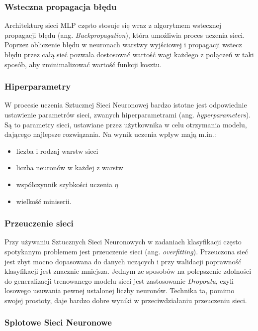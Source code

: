 \subsubsection{Wsteczna propagacja błędu}
Architekturę sieci MLP często stosuje się wraz z algorytmem wstecznej 
propagacji błędu (ang. \emph{Backpropagation}), która umożliwia proces uczenia sieci. Poprzez obliczenie błędu w neuronach warstwy wyjściowej i propagacji 
wstecz błędu przez całą sieć pozwala dostosować wartość wagi każdego z połączeń
w taki sposób, aby zminimalizować wartość funkcji kosztu.


\subsubsection{Hiperparametry}
W procesie uczenia Sztucznej Sieci Neuronowej bardzo istotne jest odpowiednie ustawienie parametrów sieci, zwanych hiperparametrami (ang. \emph{hyperparameters}). Są to parametry sieci, ustawiane przez użytkownika w celu otrzymania modelu, dającego najlepsze rozwiązania. Na wynik uczenia wpływ mają m.in.:
\begin{itemize}
  \item liczba i rodzaj warstw sieci
  \item liczba neuronów w każdej z warstw
  \item współczynnik szybkości uczenia $\eta$
  \item wielkość miniserii.
\end{itemize}

\subsubsection{Przeuczenie sieci}

Przy używaniu Sztucznych Sieci Neuronowych w zadaniach klasyfikacji często spotykanym problemem jest przeuczenie sieci (ang. \emph{overfitting}). Przeuczona sieć jest zbyt mocno dopasowana do danych uczących i przy walidacji poprawność klasyfikacji jest znacznie mniejsza. Jednym ze sposobów na polepszenie zdolności do generalizacji trenowanego modelu sieci jest zastosowanie \emph{Dropoutu}, czyli losowego usuwania pewnej ustalonej liczby neuronów. Technika ta, pomimo swojej prostoty, daje bardzo dobre wyniki w przeciwdziałaniu przeuczeniu sieci.  


\subsubsection{Splotowe Sieci Neuronowe}

